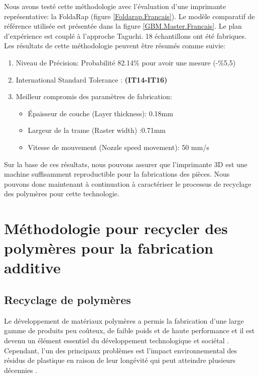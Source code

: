 Nous avons testé cette méthodologie avec l'évaluation d'une imprimante représentative: la FoldaRap (figure \ref{Foldarap.Francais}).
Le modèle comparatif de référence utilisée est présentée dans la figure \ref{GBM.Master.Francais}.
Le plan d'expérience est couplé à l'approche  Taguchi.
18 échantillons ont été fabriques. 
Les résultats de cette méthodologie peuvent être résumés comme suivie:
	
	\begin{enumerate}[noitemsep]
		\item Niveau de Précision: Probabilité 82.14\% pour avoir une mesure (-\%5,5)
		\item International Standard Tolerance : \textbf{(IT14-IT16)}
		\item Meilleur compromis des paramètres de fabrication: 
		
		\begin{itemize}[noitemsep]
			\item  Épaisseur de couche (Layer thickness): 0.18mm
			\item  Largeur de la trame (Raster width) :0.71mm
			\item  Vitesse de mouvement (Nozzle speed movement): 50 mm/s
		\end{itemize}		
	\end{enumerate}


Sur la base de ces résultats, nous pouvons assurer que l'imprimante 3D est une machine suffisamment reproductible pour la fabrications des pièces.
Nous pouvons donc maintenant à continuation à caractériser le processus de recyclage des polymères pour cette technologie.

\section*{Méthodologie pour recycler des polymères pour la fabrication additive}


\subsection*{Recyclage de polymères}

Le développement de matériaux polymères a permis la fabrication d'une large gamme de produits peu coûteux, de faible poids et de haute performance et il est devenu un élément essentiel du développement technologique et sociétal \parencite{Andrady2009}.
Cependant, l'un des principaux problèmes est l'impact environnemental des résidus de plastique en raison de leur longévité qui peut atteindre plusieurs décennies \parencite{Hopewell2009}. 

